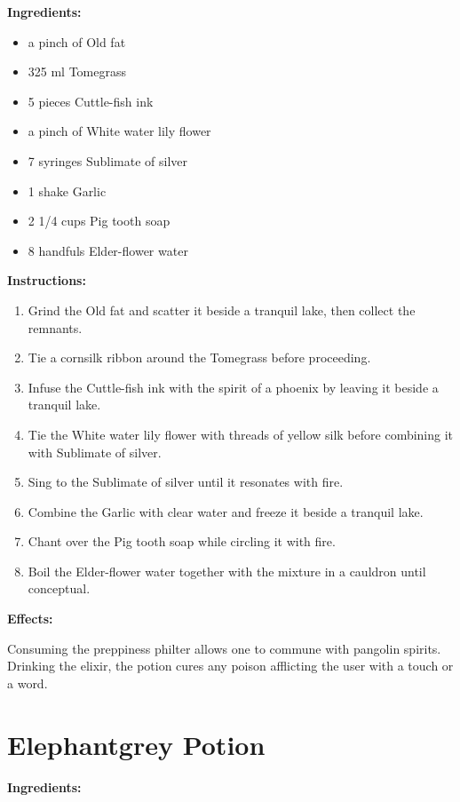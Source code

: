 \documentclass{article}
\begin{document}
\textbf{Ingredients:}

\begin{itemize}
  \item a pinch of Old fat
  \item 325 ml Tomegrass
  \item 5 pieces Cuttle-fish ink
  \item a pinch of White water lily flower
  \item 7 syringes Sublimate of silver
  \item 1 shake Garlic
  \item 2 1/4 cups Pig tooth soap
  \item 8 handfuls Elder-flower water
\end{itemize}

\textbf{Instructions:}

\begin{enumerate}
  \item Grind the Old fat and scatter it beside a tranquil lake, then collect the remnants.
  \item Tie a cornsilk ribbon around the Tomegrass before proceeding.
  \item Infuse the Cuttle-fish ink with the spirit of a phoenix by leaving it beside a tranquil lake.
  \item Tie the White water lily flower with threads of yellow silk before combining it with Sublimate of silver.
  \item Sing to the Sublimate of silver until it resonates with fire.
  \item Combine the Garlic with clear water and freeze it beside a tranquil lake.
  \item Chant over the Pig tooth soap while circling it with fire.
  \item Boil the Elder-flower water together with the mixture in a cauldron until conceptual.
\end{enumerate}

\textbf{Effects:}

Consuming the preppiness philter allows one to commune with pangolin spirits. Drinking the elixir, the potion cures any poison afflicting the user with a touch or a word.

\newpage
\section*{Elephantgrey Potion}

\textbf{Ingredients:}
\end{document}
